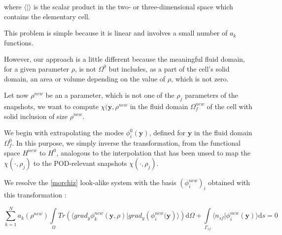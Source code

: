 where $\langle |\rangle$ is the scalar product in the two- or three-dimensional space which contains the elementary cell.

\par
This problem is simple because it is linear and involves a small number of $a_k$ functions.%


\etoile
However, our approach is a little different because the meaningful fluid domain, for a given parameter $\rho$, %
is not $\Omega^0$ but includes, as a part of the cell's solid domain, an area or volume depending on the value of $\rho$, %
which is not zero.

\par
Let now $\rho^{new}$ be an a parameter, which is not one of the $\rho_j$ parameters of the snapshots, %
we want to compute $\chi(\mathbf{y},\rho^{new}$ in the fluid domain $\Omega_f^{new}$ of the cell with solid inclusion of size $\rho^{new}$.

\par
We begin with extrapolating the modes $\phi_i^0(\mathbf{y})$, defined for $\mathbf{y}$ in the fluid domain $\Omega_f^0$. %
In this purpose, we simply inverse the transformation, from the functional space $H^{new}$ to $H^0$, %
analogous to the interpolation that has been unsed to map the $\chi(\cdot,\rho_j)$ to the POD-relevant snapshots $\chi (\cdot ,\rho_j)$.

\par
We resolve the \ref{morchiz} look-alike system with the basis $(\phi_i^{new})_i$ obtained with this transformation :

\begin{equation}\label{morchi}
\sum\limits_{k=1}^N a_k(\rho^{new})\int\limits_{\Omega}Tr\left(\langle grad_y\phi_k^{new} \left(\mathbf{y},\rho\right)|grad_y\left(\phi_i^{new}(\mathbf{y}\right)\rangle\right)\text{d}\Omega+%
\int\limits_{\Gamma_{sf}}\langle n_{sf}|\phi_i^{new}(\mathbf{y})\rangle \text{d}s %
=0
\end{equation}


